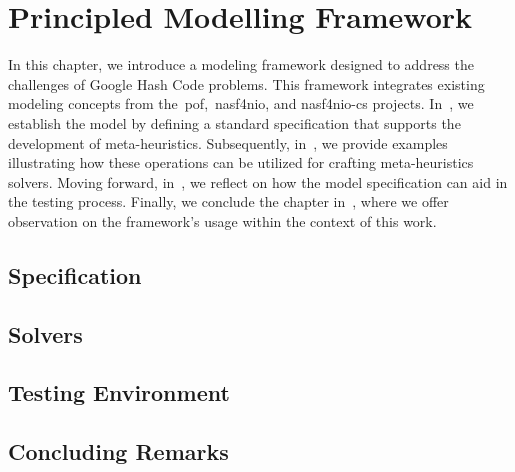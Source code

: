 \chapter{Principled Modelling Framework}
\label{ch:principled-modelling-framework}


In this chapter, we introduce a modeling framework designed to address the
challenges of Google Hash Code problems. This framework integrates existing
modeling concepts from the~\acrshort{pof},~\acrshort{nasf4nio}, and
\acrshort{nasf4nio-cs} projects. In~, we establish
the model by defining a standard specification that supports the development of
meta-heuristics. Subsequently, in~, we provide
examples illustrating how these operations can be utilized for crafting
meta-heuristics solvers. Moving forward, in~, we reflect on
how the model specification can aid in the testing process. Finally, we
conclude the chapter in~, where we offer
observation on the framework's usage within the context of this work.

\section{Specification}
\label{sec:specification}


\section{Solvers}
\label{sec:solver}


\section{Testing Environment}
\label{sec:tests}


\section{Concluding Remarks}
\label{sec:pmf-concluding-remarks}
